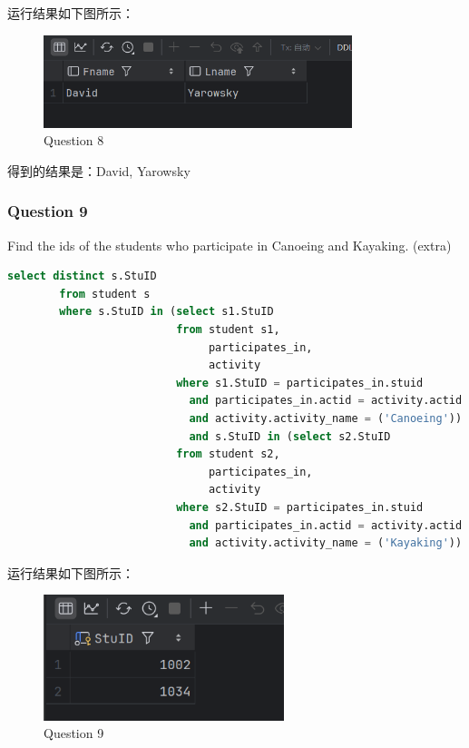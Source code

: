 \documentclass{article}
\begin{document}
    运行结果如下图所示：
    
    \begin{figure}[H]
    	\centering
    	\includegraphics[width=9cm]{./images/11.Question8.png}
    	\caption{Question 8}
    \end{figure}
    
    得到的结果是：David, Yarowsky
    
    \subsubsection{Question 9}
    
    Find the ids of the students who participate in Canoeing and Kayaking.  (extra)
    
    \begin{lstlisting}[language=sql, title=Question 9, tabsize=4]
    	select distinct s.StuID
    	from student s
    	where s.StuID in (select s1.StuID
    				      from student s1,
    					  	   participates_in,
    					  	   activity
    					  where s1.StuID = participates_in.stuid
    						and participates_in.actid = activity.actid
    						and activity.activity_name = ('Canoeing'))
    						and s.StuID in (select s2.StuID
    					  from student s2,
    						   participates_in,
    						   activity
    					  where s2.StuID = participates_in.stuid
    						and participates_in.actid = activity.actid
    						and activity.activity_name = ('Kayaking'))
    \end{lstlisting}
    
    运行结果如下图所示：
    
    \begin{figure}[H]
    	\centering
    	\includegraphics[width=7cm]{./images/12.Question9.png}
    	\caption{Question 9}
    \end{figure}
    
\end{document}
